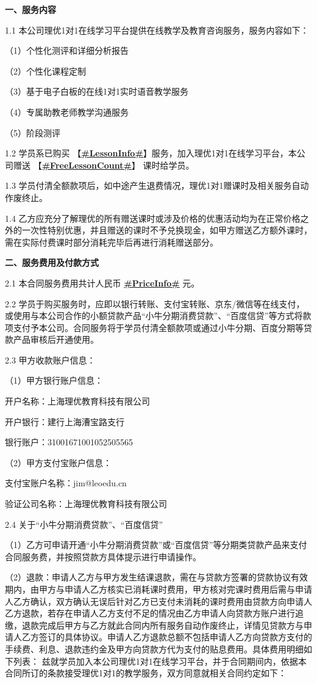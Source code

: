 \documentclass {ctexart}
\begin{document}
\textbf{一、服务内容 }

1.1	本公司理优1对1在线学习平台提供在线教学及教育咨询服务，服务内容如下：

（1）个性化测评和详细分析报告	

（2）个性化课程定制

（3）基于电子白板的在线1对1实时语音教学服务	

（4）专属助教老师教学沟通服务

（5）阶段测评

1.2	学员系已购买 【\underline{\textbf{#LessonInfo#}}】服务，加入理优1对1在线学习平台，本公司赠送    【\underline{\textbf{#FreeLessonCount#}}】  课时给学员。

1.3	学员付清全额款项后，如中途产生退费情况，理优1对1赠课时及相关服务自动作废终止。

1.4	乙方应充分了解理优的所有赠送课时或涉及价格的优惠活动均为在正常价格之外的一次性特别优惠，并且赠送的课时不予兑换现金，如甲方赠送乙方额外课时，需在实际付费课时部分消耗完毕后再进行消耗赠送部分。


\newpage
\textbf{二、服务费用及付款方式}

2.1	本合同服务费用共计人民币 \textbf{\underline{#PriceInfo#}} 元。

2.2	学员于购买服务时，应即以银行转账、支付宝转账、京东/微信等在线支付，或使用与本公司合作的小额贷款产品“小牛分期消费贷款”、“百度信贷”等方式将款项支付予本公司。合同服务将于学员付清全额款项或通过小牛分期、百度分期等贷款产品审核后开通使用。

2.3	甲方收款账户信息：

（1）甲方银行账户信息：

开户名称：上海理优教育科技有限公司

开户银行：建行上海漕宝路支行

银行账户：31001671001052505565

（2）甲方支付宝账户信息：

支付宝账户名称：jim@leoedu.cn

验证公司名称：上海理优教育科技有限公司

2.4	关于“小牛分期消费贷款”、“百度信贷”

（1）乙方可申请开通“小牛分期消费贷款”或“百度信贷”等分期类贷款产品来支付合同服务费，并按照贷款方具体提示进行申请操作。

（2）退款：申请人乙方与甲方发生结课退款，需在与贷款方签署的贷款协议有效期内，由甲方与申请人乙方核实已消耗课时费用，甲方核对完课时费用后需与申请人乙方确认，双方确认无误后针对乙方已支付未消耗的课时费用由贷款方向申请人乙方退款，若存在申请人乙方支付不足的情况由乙方申请人向贷款方账户进行追缴，退款完成后甲方与乙方就此合同内所有服务自动作废终止，详情见贷款方与申请人乙方签订的具体协议。申请人乙方退款总额不包括申请人乙方向贷款方支付的手续费、利息、退款违约金及甲方向贷款方代为支付的贴息费用。具体费用明细如下列表：
兹就学员加入本公司理优1对1在线学习平台，并于合同期间内，依据本合同所订的条款接受理优1对1的教学服务，双方同意就相关合同约定如下：
\end{document}
